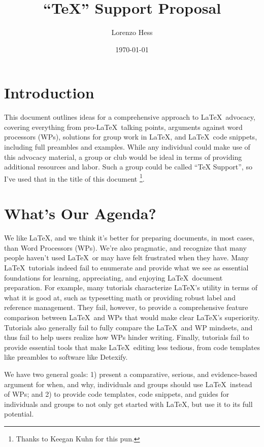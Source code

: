 \documentclass[12pt]{article}
\author{Lorenzo Hess}
\date{\today}
\title{``TeX'' Support Proposal}
\let\oldToC\tableofcontents
\renewcommand{\tableofcontents}{\begin{singlespace}\oldToC\end{singlespace}}
\begin{document}
\maketitle
\tableofcontents

\newpage
\section{Introduction}%
\label{intro}

This document outlines ideas for a comprehensive approach to \LaTeX\ advocacy, covering everything from pro-\LaTeX\ talking points, arguments against word processors (WPs), solutions for group work in \LaTeX, and \LaTeX\ code snippets, including full preambles and examples. While any individual could make use of this advocacy material, a group or club would be ideal in terms of providing additional resources and labor. Such a group could be called ``TeX Support'', so I've used that in the title of this document \footnote{Thanks to Keegan Kuhn for this pun.}.

\section{What's Our Agenda?}%
\label{agenda}

We like \LaTeX, and we think it's better for preparing documents, in most cases, than Word Processors (WPs). We're also pragmatic, and recognize that many people haven't used \LaTeX\ or may have felt frustrated when they have. Many \LaTeX\ tutorials indeed fail to enumerate and provide what we see as essential foundations for learning, appreciating, and enjoying \LaTeX\ document preparation. For example, many tutorials characterize \LaTeX's utility in terms of what it is good at, such as typesetting math or providing robust label and reference management. They fail, however, to provide a comprehensive feature comparison between \LaTeX\ and WPs that would make clear \LaTeX 's superiority. Tutorials also generally fail to fully compare the \LaTeX\ and WP mindsets, and thus fail to help users realize how WPs hinder writing. Finally, tutorials fail to provide essential tools that make \LaTeX\ editing less tedious, from code templates like preambles to software like Detexify.

We have two general goals: 1) present a comparative, serious, and evidence-based argument for when, and why, individuals and groups should use \LaTeX\ instead of WPs; and 2) to provide code templates, code snippets, and guides for individuals and groups to not only get started with \LaTeX, but use it to its full potential.
\end{document}
